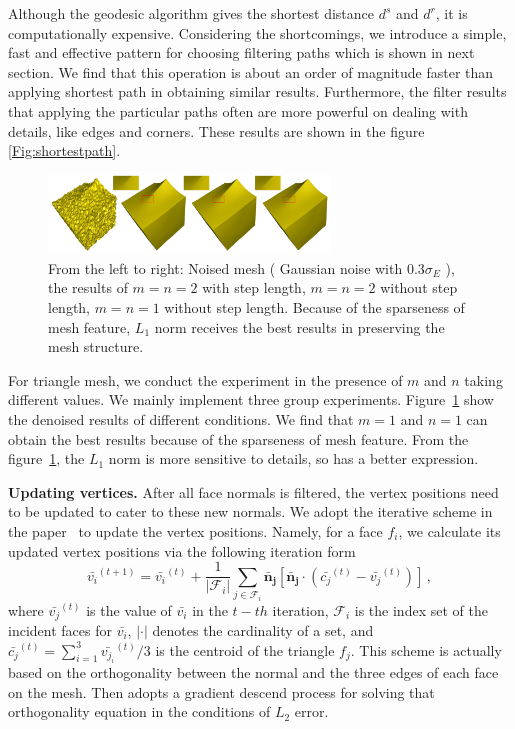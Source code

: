 Although the geodesic algorithm gives the shortest distance $d^s$ and $d^r$, it is computationally expensive.
Considering the shortcomings, we introduce a simple, fast and effective pattern for choosing filtering paths which is shown in next section.
We find that this operation is about an order of magnitude faster than applying shortest path in obtaining similar results.
Furthermore, the filter results that applying the particular paths often are more powerful on dealing with details, like edges and corners.
These results are shown in the figure \ref{Fig:shortestpath}.

\begin{figure}%
\centering
\includegraphics[width = 7.5cm]{results/Norm/norm.jpg}
\vspace{0.5mm}
\caption{ From the left to right: Noised mesh ( Gaussian noise with 0.3$\sigma_E$ ), the results of $m = n = 2$ with step length,
$m = n = 2$ without step length, $m = n = 1$ without step length.
Because of the sparseness of mesh feature, $L_1$ norm receives the best results in preserving the mesh structure.}
\label{Fig:norm}
\end{figure}

For triangle mesh, we conduct the experiment in the presence of $m$ and $n$ taking different values.
We mainly implement three group experiments. Figure~\ref{Fig:norm} show the denoised results of different conditions.
We find that $m=1$ and $n=1$ can obtain the best results because of the sparseness of mesh feature.
From the figure~\ref{Fig:norm}, the $L_1$ norm is more sensitive to details, so has a better expression.

 {\bfseries Updating vertices.} After all face normals is filtered, the vertex positions need to be updated to cater to these new normals.
 We adopt the iterative scheme in the paper~\cite{sun2007fast} to update the vertex positions.
 Namely, for a face $f_{i}$, we calculate its updated vertex positions via the following iteration form
 \begin{equation}
 \label{vertexupdate}
 \bar{v_{i}}^{(t+1)} = \bar{v_{i}}^{(t)} + \frac{1}{|{\mathcal{F}_{i}}|}\sum_{j\in\mathcal{F}_{i}}\mathbf{\bar{n}_{j}}[\mathbf{\bar{n}_{j}}\cdot(\bar{c_{j}}^{(t)}-\bar{v_{j}}^{(t)})]\, ,
 \end{equation}
 where $\bar{v_{j}}^{(t)}$ is the value of $\bar{v_{i}}$ in the $t-th$ iteration,
 $\mathcal{F}_{i}$ is the index set of the incident faces for $\bar{v_{i}}$,
 $|\cdot|$ denotes the cardinality of a set,
 and $\bar{c_{j}}^{(t)} = \sum_{i=1}^{3}\bar{v_{j_{i}}}^{(t)}/3$ is the centroid of the triangle $f_{j}$.
 This scheme is actually based on the orthogonality between the normal and the three edges of each face on the mesh.
 Then adopts a gradient descend process for solving that orthogonality equation in the conditions of  $L_2$ error.

